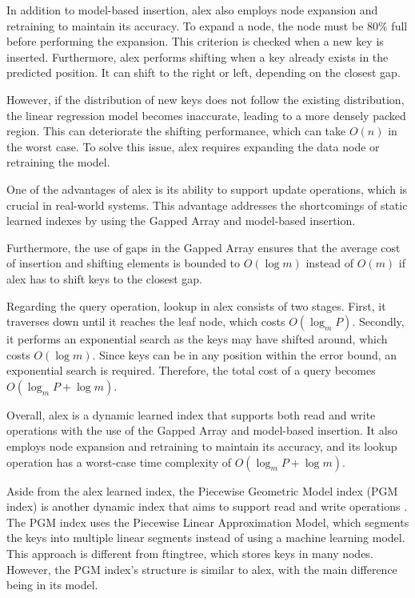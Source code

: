 In addition to model-based insertion, \acrshort{alex} also employs node expansion and retraining to maintain its accuracy. To expand a node, the node must be $80\%$ full before performing the expansion. This criterion is checked when a new key is inserted. Furthermore, \acrshort{alex} performs shifting when a key already exists in the predicted position. It can shift to the right or left, depending on the closest gap.

However, if the distribution of new keys does not follow the existing distribution, the linear regression model becomes inaccurate, leading to a more densely packed region. This can deteriorate the shifting performance, which can take $O(n)$ in the worst case. To solve this issue, \acrshort{alex} requires expanding the data node or retraining the model.

One of the advantages of \acrshort{alex} is its ability to support update operations, which is crucial in real-world systems. This advantage addresses the shortcomings of static learned indexes by using the \textsf{Gapped Array} and model-based insertion.

Furthermore, the use of gaps in the \textsf{Gapped Array} ensures that the average cost of insertion and shifting elements is bounded to $O(\log m)$ instead of $O(m)$ if \acrshort{alex} has to shift keys to the closest gap.

Regarding the query operation, lookup in \acrshort{alex} consists of two stages. First, it traverses down until it reaches the leaf node, which costs $O(\log_m P)$. Secondly, it performs an exponential search as the keys may have shifted around, which costs $O(\log m)$. Since keys can be in any position within the error bound, an exponential search is required. Therefore, the total cost of a query becomes $O(\log_m P + \log m)$.

Overall, \acrshort{alex} is a dynamic learned index that supports both read and write operations with the use of the \textsf{Gapped Array} and model-based insertion. It also employs node expansion and retraining to maintain its accuracy, and its lookup operation has a worst-case time complexity of $O(\log_m P + \log m)$.

Aside from the \acrshort{alex} learned index, the Piecewise Geometric Model index (PGM index) is another dynamic index that aims to support read and write operations \cite{PGM}. The PGM index uses the Piecewise Linear Approximation Model, which segments the keys into multiple linear segments instead of using a machine learning model. This approach is different from \acrshort{ftingtree}, which stores keys in many nodes. However, the PGM index's structure is similar to \acrshort{alex}, with the main difference being in its model.

